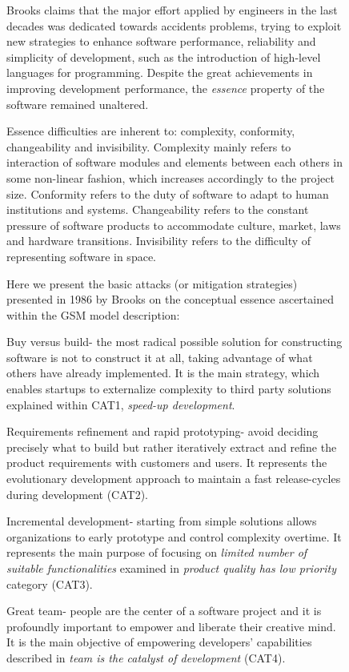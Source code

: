 \documentclass[12pt,journal,compsoc]{../sty/IEEEtran}
\begin{document}
\begin{table}[!t]
\begin{figure}[!t]
\begin{compactitem}
Brooks claims that the major effort applied by engineers in the last decades
was dedicated towards accidents problems, trying to exploit new strategies to
enhance software performance, reliability and simplicity of development, such as
the introduction of high-level languages for programming.  Despite the great
achievements in improving development performance, the \textit{essence} property
of the software remained unaltered.

Essence difficulties are inherent to: complexity, conformity, changeability and
invisibility. Complexity  mainly refers to interaction of software modules and
elements between each others in some non-linear fashion, which increases
accordingly to the project size. Conformity refers to the duty of software to
adapt to human institutions and systems. Changeability  refers to the constant
pressure of software products to accommodate culture, market, laws and hardware
transitions. Invisibility  refers to the difficulty of representing software in
space.

Here we present the basic attacks (or mitigation strategies) presented in 1986
by Brooks on the conceptual essence ascertained within the GSM model
description:


\begin{compactitem}

\item Buy versus build-  the most radical possible solution for constructing
software is not to construct it at all, taking advantage of what others have
already implemented. It is the main strategy, which enables startups to
externalize complexity to third party solutions explained within CAT1,   \textit
{speed-up development}. \item Requirements refinement and rapid prototyping-
avoid deciding precisely  what to build but rather iteratively extract and
refine the product requirements  with customers and users. It represents the
evolutionary development approach to  maintain a fast release-cycles during
development (CAT2). \item Incremental development- starting from simple
solutions allows  organizations to early prototype and control complexity
overtime. It represents  the main purpose of focusing on \textit{limited number
of suitable  functionalities} examined in \textit{product quality has low
priority}  category  (CAT3). \item Great team- people are the center of a
software project and it is  profoundly important to empower and liberate their
creative mind. It is the main  objective of empowering developers' capabilities
described in \textit{team is  the catalyst of development} (CAT4).
\end{compactitem}


\end{compactitem}
\end{figure}
\end{table}
\end{document}
